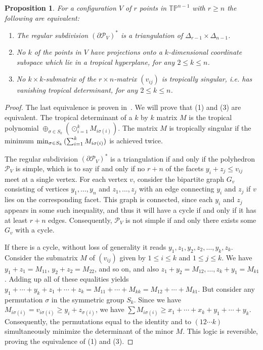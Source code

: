 \documentclass[11pt]{amsart}
\newtheorem{prop}[thm]{Proposition}
\newcommand{\TP}{\mathbb{TP}}
\begin{document}
\begin{prop} \label{thegenericcase}
 For a configuration  $V$ of $r $ points in
$\TP^{n-1}$ with $r \geq n$ the following are equivalent:
\begin{enumerate}
\item The regular subdivision $(\partial {\mathcal P}_V)^*$ is 
 a triangulation of $\Delta_{r-1} \times \Delta_{n-1}$.
\item No $k$ of the points in $V$ have projections onto a $k$-dimensional coordinate subspace which lie in a tropical 
hyperplane, for any $2\le k\le n$. 
\item No $k \times k$-submatrix of the
$r \times n$-matrix $(v_{ij})$ is tropically singular, i.e. has vanishing tropical determinant, for any $2\le k\le 
n$.
\end{enumerate}
\end{prop}

\begin{proof}
The last equivalence is proven in~\cite[Lemma 5.1]{RGST}. We will prove that (1) and (3) are equivalent. The tropical determinant of
a  $k$ by $k$ matrix $M$ is the tropical polynomial
$\oplus_{\sigma\in S_k} (\odot_{i=1}^k M_{i\sigma(i)})$. 
The matrix $M$ is tropically singular
if the minimum ${\rm
min}_{\sigma\in S_k}\,(\sum_{i=1}^k M_{i\sigma(i)})$ is achieved twice.

The regular subdivision $(\partial {\mathcal P}_V)^*$ is a triangulation if and only if the polyhedron ${\mathcal P}_V$
is simple, which is to say if and only if no $r+n$ of the facets $y_i+z_j\le v_{ij}$ meet at a single vertex. For
each vertex $v$, consider the bipartite graph $G_v$ consisting of vertices $y_1,\ldots,y_n$ and $z_1,\ldots,z_j$ with
an edge connecting $y_i$ and $z_j$ if $v$ lies on the corresponding facet. This graph is connected, since each $y_i$
and $z_j$ appears in some such inequality, and thus it will have a cycle if and only if it has at least $r+n$ edges.
Consequently, ${\mathcal P}_V$ is not simple if and only there exists some $G_v$ with a cycle.

If there is a cycle, without loss of generality it reads $y_1, z_1, y_2,
z_2, \ldots, y_k, z_k$. Consider the submatrix $M$ of $(v_{ij})$ given by
$1\le i\le k$ and $1\le j\le k$. We have $y_1+z_1=M_{11}$,
$y_2+z_2=M_{22}$, and so on, and also $z_1+y_2=M_{12}, \ldots,z_k+y_1 =
M_{k1}$. Adding up all of these equalities yields
$y_1+\cdots+y_k+z_1+\cdots+z_k= M_{11}+\cdots+M_{kk} =
M_{12}+\cdots+M_{k1}$. But consider any permutation $\sigma$ in the 
symmetric group $S_k$. Since
we have $M_{i\sigma(i)}=v_{i\sigma(i)} \ge y_i+z_{\sigma(i)}$, we have
$\sum M_{i\sigma(i)}\ge x_1+\cdots+x_k+y_1+\cdots+y_k$. Consequently, the
permutations equal to the identity and to $(12\cdots k)$ simultaneously
minimize the determinant of the minor $M$. This logic is reversible,
proving the equivalence of (1) and (3).

\end{proof}
\end{document}
